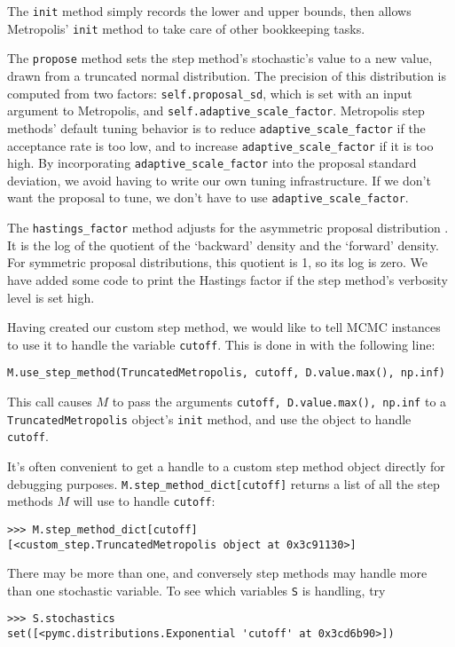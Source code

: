 The \texttt{init} method simply records the lower and upper bounds, then allows Metropolis' \texttt{init} method to take care of other bookkeeping tasks. 

The \texttt{propose} method sets the step method's stochastic's value to a new value, drawn from a truncated normal distribution. The precision of this distribution is computed from two factors: \texttt{self.proposal_sd}, which is set with an input argument to Metropolis, and \texttt{self.adaptive_scale_factor}. Metropolis step methods' default tuning behavior is to reduce \texttt{adaptive_scale_factor} if the acceptance rate is too low, and to increase \texttt{adaptive_scale_factor} if it is too high. By incorporating \texttt{adaptive_scale_factor} into the proposal standard deviation, we avoid having to write our own tuning infrastructure. If we don't want the proposal to tune, we don't have to use \texttt{adaptive_scale_factor}.

The \texttt{hastings_factor} method adjusts for the asymmetric proposal distribution \cite{gelman}. It is the log of the quotient of the `backward' density and the `forward' density. For symmetric proposal distributions, this quotient is 1, so its log is zero. We have added some code to print the Hastings factor if the step method's verbosity level is set high.

\medskip
Having created our custom step method, we would like to tell MCMC instances to use it to handle the variable \texttt{cutoff}. This is done in  with the following line:
\begin{verbatim}
M.use_step_method(TruncatedMetropolis, cutoff, D.value.max(), np.inf)
\end{verbatim}
This call causes $M$ to pass the arguments \texttt{cutoff, D.value.max(), np.inf} to a \texttt{TruncatedMetropolis} object's \texttt{init} method, and use the object to handle \texttt{cutoff}. 

\medskip
It's often convenient to get a handle to a custom step method object directly for debugging purposes. \texttt{M.step_method_dict[cutoff]} returns a list of all the step methods $M$ will use to handle \texttt{cutoff}:
\begin{verbatim}
>>> M.step_method_dict[cutoff]
[<custom_step.TruncatedMetropolis object at 0x3c91130>]
\end{verbatim}
There may be more than one, and conversely step methods may handle more than one stochastic variable. To see which variables \texttt{S} is handling, try
\begin{verbatim}
>>> S.stochastics
set([<pymc.distributions.Exponential 'cutoff' at 0x3cd6b90>])
\end{verbatim}

